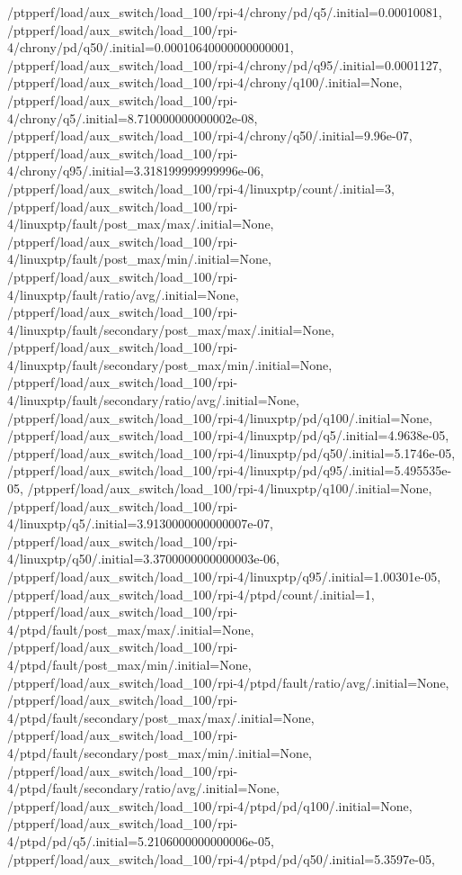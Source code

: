 {    /ptpperf/load/aux_switch/load_100/rpi-4/chrony/pd/q5/.initial=0.00010081,
    /ptpperf/load/aux_switch/load_100/rpi-4/chrony/pd/q50/.initial=0.00010640000000000001,
    /ptpperf/load/aux_switch/load_100/rpi-4/chrony/pd/q95/.initial=0.0001127,
    /ptpperf/load/aux_switch/load_100/rpi-4/chrony/q100/.initial=None,
    /ptpperf/load/aux_switch/load_100/rpi-4/chrony/q5/.initial=8.710000000000002e-08,
    /ptpperf/load/aux_switch/load_100/rpi-4/chrony/q50/.initial=9.96e-07,
    /ptpperf/load/aux_switch/load_100/rpi-4/chrony/q95/.initial=3.318199999999996e-06,
    /ptpperf/load/aux_switch/load_100/rpi-4/linuxptp/count/.initial=3,
    /ptpperf/load/aux_switch/load_100/rpi-4/linuxptp/fault/post_max/max/.initial=None,
    /ptpperf/load/aux_switch/load_100/rpi-4/linuxptp/fault/post_max/min/.initial=None,
    /ptpperf/load/aux_switch/load_100/rpi-4/linuxptp/fault/ratio/avg/.initial=None,
    /ptpperf/load/aux_switch/load_100/rpi-4/linuxptp/fault/secondary/post_max/max/.initial=None,
    /ptpperf/load/aux_switch/load_100/rpi-4/linuxptp/fault/secondary/post_max/min/.initial=None,
    /ptpperf/load/aux_switch/load_100/rpi-4/linuxptp/fault/secondary/ratio/avg/.initial=None,
    /ptpperf/load/aux_switch/load_100/rpi-4/linuxptp/pd/q100/.initial=None,
    /ptpperf/load/aux_switch/load_100/rpi-4/linuxptp/pd/q5/.initial=4.9638e-05,
    /ptpperf/load/aux_switch/load_100/rpi-4/linuxptp/pd/q50/.initial=5.1746e-05,
    /ptpperf/load/aux_switch/load_100/rpi-4/linuxptp/pd/q95/.initial=5.495535e-05,
    /ptpperf/load/aux_switch/load_100/rpi-4/linuxptp/q100/.initial=None,
    /ptpperf/load/aux_switch/load_100/rpi-4/linuxptp/q5/.initial=3.9130000000000007e-07,
    /ptpperf/load/aux_switch/load_100/rpi-4/linuxptp/q50/.initial=3.3700000000000003e-06,
    /ptpperf/load/aux_switch/load_100/rpi-4/linuxptp/q95/.initial=1.00301e-05,
    /ptpperf/load/aux_switch/load_100/rpi-4/ptpd/count/.initial=1,
    /ptpperf/load/aux_switch/load_100/rpi-4/ptpd/fault/post_max/max/.initial=None,
    /ptpperf/load/aux_switch/load_100/rpi-4/ptpd/fault/post_max/min/.initial=None,
    /ptpperf/load/aux_switch/load_100/rpi-4/ptpd/fault/ratio/avg/.initial=None,
    /ptpperf/load/aux_switch/load_100/rpi-4/ptpd/fault/secondary/post_max/max/.initial=None,
    /ptpperf/load/aux_switch/load_100/rpi-4/ptpd/fault/secondary/post_max/min/.initial=None,
    /ptpperf/load/aux_switch/load_100/rpi-4/ptpd/fault/secondary/ratio/avg/.initial=None,
    /ptpperf/load/aux_switch/load_100/rpi-4/ptpd/pd/q100/.initial=None,
    /ptpperf/load/aux_switch/load_100/rpi-4/ptpd/pd/q5/.initial=5.2106000000000006e-05,
    /ptpperf/load/aux_switch/load_100/rpi-4/ptpd/pd/q50/.initial=5.3597e-05,
}
